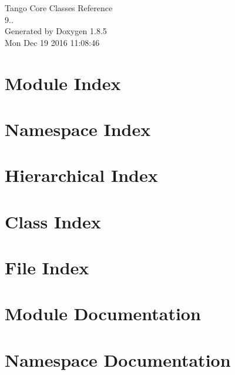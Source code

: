 \documentclass[twoside]{book}
\newcommand{\clearemptydoublepage}{%
  \newpage{\pagestyle{empty}\cleardoublepage}%
}
\begin{document}
\begin{titlepage}
\vspace*{7cm}
\begin{center}%
{\Large Tango Core Classes Reference \\[1ex]\large 9.. }\\
\vspace*{1cm}
{\large Generated by Doxygen 1.8.5}\\
\vspace*{0.5cm}
{\small Mon Dec 19 2016 11:08:46}\\
\end{center}
\end{titlepage}
\clearemptydoublepage
\tableofcontents
\clearemptydoublepage
{}

\chapter{Module Index}

\chapter{Namespace Index}

\chapter{Hierarchical Index}

\chapter{Class Index}

\chapter{File Index}

\chapter{Module Documentation}






\chapter{Namespace Documentation}




\end{document}
